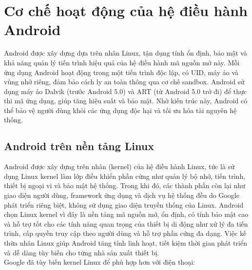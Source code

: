 \section{Cơ chế hoạt động của hệ điều hành Android}

    Android được xây dựng dựa trên nhân Linux, tận dụng tính ổn định, bảo mật và khả năng quản lý tiến trình hiệu quả của hệ điều hành mã nguồn mở này. Mỗi ứng dụng Android hoạt động trong một tiến trình độc lập, có UID, máy ảo và vùng nhớ riêng, đảm bảo cách ly an toàn thông qua cơ chế sandbox. Android sử dụng máy ảo Dalvik (trước Android 5.0) và ART (từ Android 5.0 trở đi) để thực thi mã ứng dụng, giúp tăng hiệu suất và bảo mật. Nhờ kiến trúc này, Android có thể bảo vệ người dùng khỏi các ứng dụng độc hại và tối ưu hóa tài nguyên hệ thống.
\newpage
\subsection{Android trên nền tảng Linux}
\renewcommand{\labelitemi}{--}    
    Android được xây dựng trên nhân (kernel) của hệ điều hành Linux, tức là sử dụng Linux kernel làm lớp điều khiển phần cứng như quản lý bộ nhớ, tiến trình, thiết bị ngoại vi và bảo mật hệ thống. Trong khi đó, các thành phần còn lại như giao diện người dùng, framework ứng dụng và dịch vụ hệ thống đều do Google phát triển riêng biệt, không sử dụng giao diện truyền thống của Linux. Android chọn Linux kernel vì đây là nền tảng mã nguồn mở, ổn định, có tính bảo mật cao và hỗ trợ tốt cho các tính năng quan trọng của thiết bị di động như xử lý đa tiến trình, cấp quyền truy cập theo người dùng và hỗ trợ phần cứng đa dạng. Việc kế thừa nhân Linux giúp Android tăng tính linh hoạt, tiết kiệm thời gian phát triển và dễ dàng tùy biến cho từng nhà sản xuất thiết bị.\\
    Google đã tùy biến kernel Linux để phù hợp hơn với điện thoại:
